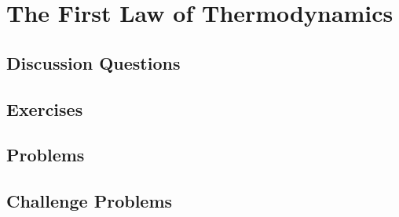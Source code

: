 
\chapter{The First Law of Thermodynamics}

\section{Discussion Questions}

\section{Exercises}

\section{Problems}

\section{Challenge Problems}
